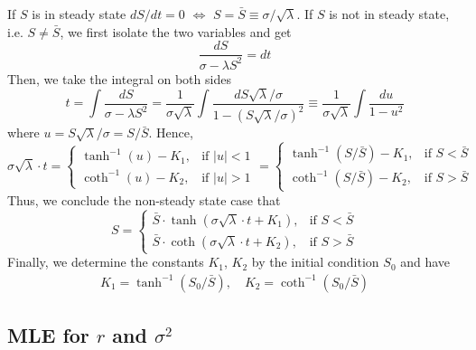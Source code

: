 \documentclass[mnsc]{informs3}
\begin{document}
\begin{APPENDICES}
If $S$ is in steady state $dS/dt = 0$ $\Leftrightarrow$ $S = \bar{S} \equiv \sigma/\sqrt{\lambda}$. 
If $S$ is not in steady state, i.e. $S\not=\bar{S}$, we first isolate the two variables and get 
\begin{equation*}
	\frac{dS}{\sigma-\lambda S^2} = dt
\end{equation*}
Then, we take the integral on both sides
\begin{equation*}
    t = \int \frac{dS}{\sigma-\lambda S^2} = \frac{1}{\sigma\sqrt{\lambda}} \int \frac{dS\sqrt{\lambda}/\sigma}{1 - (S\sqrt{\lambda}/\sigma)^2} \equiv \frac{1}{\sigma\sqrt{\lambda}}\int \frac{du}{1-u^2} 
\end{equation*}
where $u = S\sqrt{\lambda}/\sigma = S/\bar{S}$. Hence, 
\begin{equation*}
    \sigma\sqrt{\lambda}\cdot t = \begin{cases}
        \tanh^{-1}(u)-K_1, & \text{if } |u|<1\\
        \coth^{-1}(u)-K_2, & \text{if } |u|>1
    \end{cases} = \begin{cases}
        \tanh^{-1}(S/\bar{S})-K_1, & \text{if } S<\bar{S}\\
        \coth^{-1}(S/\bar{S})-K_2, & \text{if } S>\bar{S} 
\end{cases}
\end{equation*}
Thus, we conclude the non-steady state case that 
\begin{equation*}
	S = \begin{cases}
		\bar{S}\cdot\tanh(\sigma\sqrt{\lambda}\cdot t + K_1), & \text{if } S<\bar{S}\\
		\bar{S}\cdot\coth(\sigma\sqrt{\lambda}\cdot t + K_2), & \text{if } S>\bar{S} 
	\end{cases}
\end{equation*}
Finally, we determine the constants $K_1$, $K_2$ by the initial condition $S_0$ and have 
\begin{align*}
	K_1 = \tanh^{-1}(S_0/\bar{S}),\quad
	K_2 = \coth^{-1}(S_0/\bar{S})
\end{align*}


\subsection{MLE for $r$ and $\sigma^2$}\label{appexidx-normal-MLE}


\end{APPENDICES}
\end{document}
